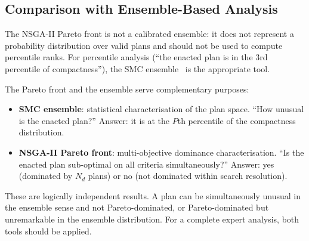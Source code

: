 \subsection{Comparison with Ensemble-Based Analysis}

The NSGA-II Pareto front is not a calibrated ensemble: it does not represent
a probability distribution over valid plans and should not be used to compute
percentile ranks.
For percentile analysis (``the enacted plan is in the 3rd percentile of
compactness''), the SMC ensemble~\citep{dellaLibera2026smc} is the
appropriate tool.

The Pareto front and the ensemble serve complementary purposes:

\begin{itemize}
\item \textbf{SMC ensemble}: statistical characterisation of the plan space.
  ``How unusual is the enacted plan?''
  Answer: it is at the $P$th percentile of the compactness distribution.

\item \textbf{NSGA-II Pareto front}: multi-objective dominance characterisation.
  ``Is the enacted plan sub-optimal on all criteria simultaneously?''
  Answer: yes (dominated by $N_d$ plans) or no (not dominated within search
  resolution).
\end{itemize}

These are logically independent results.
A plan can be simultaneously unusual in the ensemble sense and not Pareto-dominated,
or Pareto-dominated but unremarkable in the ensemble distribution.
For a complete expert analysis, both tools should be applied.
